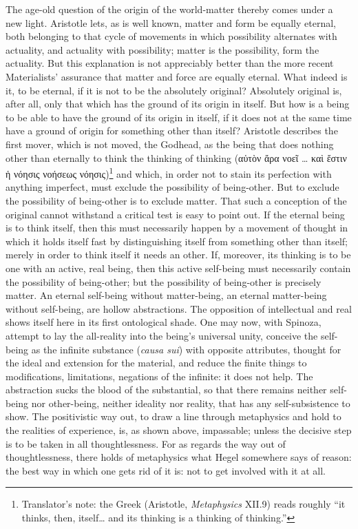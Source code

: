 \documentclass[12pt]{article}
\begin{document}
The age-old question of the origin of the world-matter thereby comes under a
new light. Aristotle lets, as is well known, matter and form be equally
eternal, both belonging to that cycle of movements in which possibility
alternates with actuality, and actuality with possibility; matter is the
possibility, form the actuality. But this explanation is not appreciably
better than the more recent Materialists' assurance that matter and force
are equally eternal. What indeed is it, to be eternal, if it is not to be
the absolutely original? Absolutely original is, after all, only that which
has the ground of its origin in itself. But how is a being to be able to
have the ground of its origin in itself, if it does not at the same time
have a ground of origin for something other than itself? Aristotle describes
the first mover, which is not moved, the Godhead, as the being that does
nothing other than eternally to think the thinking of thinking (αὑτὸν ἄρα
νοεῖ \ldots{} καὶ ἔστιν ἡ νόησις νοήσεως νόησις)\footnote{Translator's note:
the Greek (Aristotle, \emph{Metaphysics} XII.9) reads roughly ``it thinks,
then, itself\ldots{} and its thinking is a thinking of thinking.''} and
which, in order not to stain its perfection with anything imperfect, must
exclude the possibility of being-other. But to exclude the possibility of
being-other is to exclude matter. That such a conception of the original
cannot withstand a critical test is easy to point out. If the eternal being
is to think itself, then this must necessarily happen by a movement of
thought in which it holds itself fast by distinguishing itself from something
other than itself; merely in order to think itself it needs an other. If,
moreover, its thinking is to be one with an active, real being, then this
active self-being must necessarily contain the possibility of being-other;
but the possibility of being-other is precisely matter. An eternal
self-being without matter-being, an eternal matter-being without self-being,
are hollow abstractions. The opposition of intellectual and real shows
itself here in its first ontological shade. One may now, with Spinoza,
attempt to lay the all-reality into the being's universal unity, conceive
the self-being as the infinite substance (\textit{causa sui}) with opposite
attributes, thought for the ideal and extension for the material, and reduce
the finite things to modifications, limitations, negations of the infinite:
it does not help. The abstraction sucks the blood of the substantial, so
that there remains neither self-being nor other-being, neither ideality nor
reality, that has any self-subsistence to show. The positivistic way out, to
draw a line through metaphysics and hold to the realities of experience, is,
as shown above, impassable; unless the decisive step is to be taken in all
thoughtlessness. For as regards the way out of thoughtlessness, there holds
of metaphysics what Hegel somewhere says of reason: the best way in which one
gets rid of it is: not to get involved with it at all.
\end{document}

